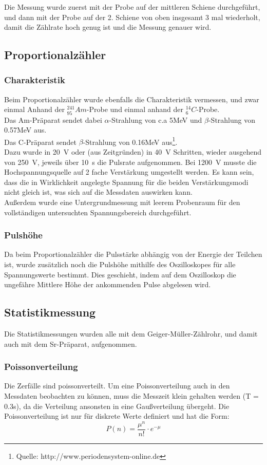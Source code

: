 \documentclass[12pt,a4paper]{article}
\begin{document}
Die Messung wurde zuerst mit der Probe auf der mittleren Schiene durchgeführt, und dann mit der Probe auf der 2. Schiene von oben insgesamt 3 mal wiederholt, damit die Zählrate hoch genug ist und die Messung genauer wird.
\subsection{Proportionalzähler}

\subsubsection{Charakteristik}
Beim Proportionalzähler wurde ebenfalls die Charakteristik vermessen, und zwar einmal Anhand der $_{95}^{241}Am$-Probe und einmal anhand der $_6^{14}C$-Probe. \\
Das Am-Präparat sendet dabei $\alpha$-Strahlung von c.a 5MeV und $\beta$-Strahlung von 0.57MeV aus.\\
Das C-Präparat sendet $\beta$-Strahlung von 0.16MeV aus\footnote{Quelle: http://www.periodensystem-online.de}.\\
Dazu wurde in \SI{20}{V} oder (aus Zeitgründen) in \SI{40}{V} Schritten, wieder ausgehend von \SI{250}{V}, jeweils über \SI{10}{s} die Pulsrate aufgenommen. Bei \SI{1200}{V} musste die Hochspannungsquelle auf 2 fache Verstärkung umgestellt werden. Es kann sein, dass die in Wirklichkeit angelegte Spannung für die beiden Verstärkungsmodi nicht gleich ist, was sich auf die Messdaten auswirken kann.\\
Außerdem wurde eine Untergrundmessung mit leerem Probenraum für den vollständigen untersuchten Spannungsbereich durchgeführt.

\subsubsection{Pulshöhe}
Da beim Proportionalzähler die Pulsstärke abhängig von der Energie der Teilchen ist, wurde zusätzlich noch die Pulshöhe mithilfe des Oszilloskopes für alle Spannungswerte bestimmt.  Dies geschieht, indem auf dem Oszilloskop die ungefähre Mittlere Höhe der ankommenden Pulse abgelesen wird.

\subsection{Statistikmessung}
Die Statistikmessungen wurden alle mit dem Geiger-Müller-Zählrohr, und damit auch mit dem Sr-Präparat, aufgenommen.
\subsubsection{Poissonverteilung}
Die Zerfälle sind poissonverteilt. Um eine Poissonverteilung auch in den Messdaten beobachten zu können, muss die Messzeit klein gehalten werden (T = 0.3s), da die Verteilung ansonsten in eine Gaußverteilung übergeht. Die Poissonverteilung ist nur für diskrete Werte definiert und hat die Form:
\begin{equation}
P(n) = \dfrac{\mu ^n}{n!} \cdot e^{-\mu}
\end{equation}
\end{document}
